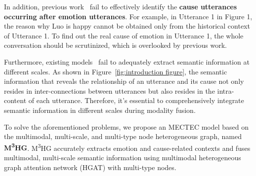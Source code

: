 \documentclass[11pt]{article}
\begin{document}
In addition, previous work~\cite{ecf, UniMEEC, wang2023generative, li2024multimodal, wei2020effective} fail to effectively identify the \textbf{cause utterances occurring after emotion utterances}. 
For example, in Utterance 1 in Figure 1, the reason why Luo is happy cannot be obtained only from the historical context of Utterance 1.
To find out the real cause of emotion in Utterance 1, the whole conversation should be scrutinized, which is overlooked by previous work.

Furthermore, existing models~\cite{ecf, UniMEEC, wang2023generative, li2024multimodal} fail to adequately extract semantic information at different scales.
As shown in Figure~\ref{fig:introduction figure}, the semantic information that reveals the relationship of an utterance and its cause not only resides in inter-connections between utterances but also resides in the intra-content of each utterance.
Therefore, it's essential to comprehensively integrate semantic information in different scales during modality fusion.

To solve the aforementioned problems, we propose an MECTEC model based on the multimodal, multi-scale, and multi-type node heterogeneous graph, named \textbf{M\textsuperscript{3}HG}.
M\textsuperscript{3}HG accurately extracts emotion and cause-related contexts and fuses multimodal, multi-scale semantic information using multimodal heterogeneous graph attention network (HGAT) with multi-type nodes.
\end{document}
